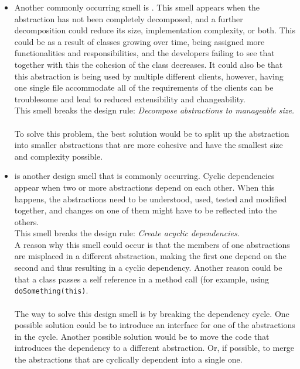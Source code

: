 \begin{itemize}
            \item Another commonly occurring smell is . This smell appears when the abstraction has not been completely decomposed, and a further decomposition could reduce its size, implementation complexity, or both. This could be as a result of classes growing over time, being assigned more functionalities and responsibilities, and the developers failing to see that together with this the cohesion of the class decreases. It could also be that this abstraction is being used by multiple different clients, however, having one single file accommodate all of the requirements of the clients can be troublesome and lead to reduced extensibility and changeability.\\
            This smell breaks the design rule: \textit{Decompose abstractions to manageable size.}\\\\
            To solve this problem, the best solution would be to split up the abstraction into smaller abstractions that are more cohesive and have the smallest size and complexity possible.
            
            \item {} is another design smell that is commonly occurring. Cyclic dependencies appear when two or more abstractions depend on each other. When this happens, the abstractions need to be understood, used, tested and modified together, and changes on one of them might have to be reflected into the others. \\ 
            This smell breaks the design rule:
            \textit{Create acyclic dependencies.} \\
            A reason why this smell could occur is that the members of one abstractions are misplaced in a different abstraction, making the first one depend on the second and thus resulting in a cyclic dependency. Another reason could be that a class passes a self reference in a method call (for example, using \texttt{doSomething(this)}. \\\\
            The way to solve this design smell is by breaking the dependency cycle. One possible solution could be to introduce an interface for one of the abstractions in the cycle. Another possible solution would be to move the code that introduces the dependency to a different abstraction. Or, if possible, to merge the abstractions that are cyclically dependent into a single one.
        \end{itemize}
 